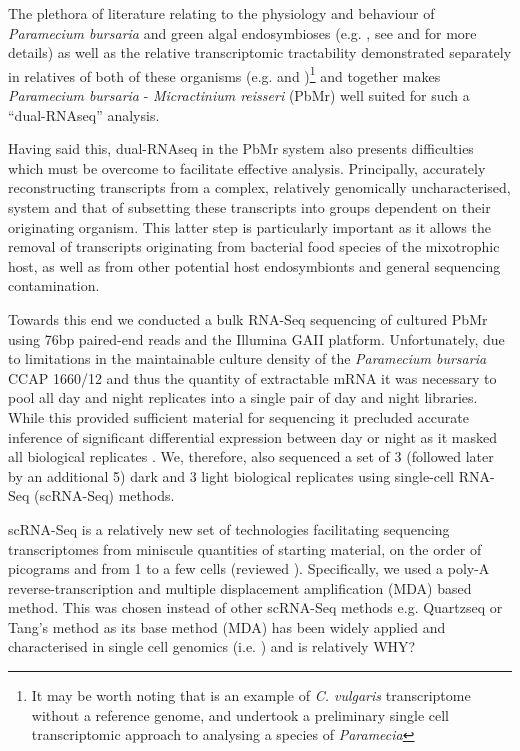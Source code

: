 The plethora of literature relating to the physiology and behaviour of \textit{Paramecium bursaria} and green algal endosymbioses (e.g. \citep{Iwatsuki1988}, 
    see \citep{Kato2009a} and  for more details) as well as the relative transcriptomic tractability demonstrated separately in relatives of
    both of these organisms (e.g. \citep{Guarnieri2011,Rowe2014,Bashan2015} and \citep{Arnaiz2010,Kolisko2014})\footnote{It may be worth noting
        that \citep{Guarnieri2011} is an example of \textit{C. vulgaris} transcriptome without a reference genome, and \citep{Kolisko2014} undertook
    a preliminary single cell transcriptomic approach to analysing a species of \textit{Paramecia}}
and together \citep{Kodama2014} makes \textit{Paramecium bursaria} - \textit{Micractinium reisseri} (PbMr)
well suited for such a ``dual-RNAseq'' analysis.  

Having said this, dual-RNAseq in the PbMr system also presents difficulties which must be overcome to facilitate effective analysis.
Principally, accurately reconstructing transcripts from a complex, relatively genomically uncharacterised, system and 
that of subsetting these transcripts into groups dependent on their originating organism.  This latter step is particularly important
as it allows the removal of transcripts originating from bacterial food species of the mixotrophic host, as well as from other potential
host endosymbionts and general sequencing contamination.  


Towards this end we conducted a bulk RNA-Seq sequencing of cultured PbMr using 76bp paired-end reads and the Illumina GAII platform.
Unfortunately, due to limitations in the maintainable culture density of the \textit{Paramecium bursaria} CCAP 1660/12 and thus the quantity of extractable
mRNA it was necessary to pool all day and night replicates into a single pair of day and night libraries. 
While this provided sufficient material for sequencing it precluded accurate inference of significant differential expression between day or night
as it masked all biological replicates \citep{Auer2010}.  We, therefore, also sequenced a set of 3 (followed later by an additional 5) dark and 3 light
biological replicates using single-cell RNA-Seq (scRNA-Seq) methods. 


scRNA-Seq is a relatively new set of technologies facilitating sequencing transcriptomes from miniscule quantities of starting material, on the order of picograms
and from 1 to a few cells (reviewed \citep{Macaulay2014,Liang2014,Wu2014a}).  Specifically, we used a poly-A reverse-transcription
and multiple displacement amplification (MDA) based method.  
This was chosen instead of other scRNA-Seq methods e.g. Quartzseq \citep{Sasagawa2013} or 
Tang's method \citep{Tang2009} as its base method (MDA) has been widely applied and characterised in single cell genomics (i.e. \citep{Spits2006}) and is
relatively WHY?


